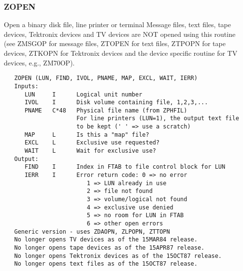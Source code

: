 \subsubsection{ZOPEN}
Open a binary disk file, line printer or terminal  Message files, text
files, tape devices, Tektronix devices and TV devices are NOT opened
using this routine (see ZMSGOP for message files, ZTOPEN for text
files, ZTPOPN for tape devices, ZTKOPN for Tektronix devices and the
device specific routine for TV devices, e.g., ZM70OP).
\begin{verbatim}
   ZOPEN (LUN, FIND, IVOL, PNAME, MAP, EXCL, WAIT, IERR)
   Inputs:
      LUN     I      Logical unit number
      IVOL    I      Disk volume containing file, 1,2,3,...
      PNAME   C*48   Physical file name (from ZPHFIL)
                     For line printers (LUN=1), the output text file
                     to be kept (' ' => use a scratch)
      MAP     L      Is this a "map" file?
      EXCL    L      Exclusive use requested?
      WAIT    L      Wait for exclusive use?
   Output:
      FIND    I      Index in FTAB to file control block for LUN
      IERR    I      Error return code: 0 => no error
                        1 => LUN already in use
                        2 => file not found
                        3 => volume/logical not found
                        4 => exclusive use denied
                        5 => no room for LUN in FTAB
                        6 => other open errors
   Generic version - uses ZDAOPN, ZLPOPN, ZTTOPN
   No longer opens TV devices as of the 15MAR84 release.
   No longer opens tape devices as of the 15APR87 release.
   No longer opens Tektronix devices as of the 15OCT87 release.
   No longer opens text files as of the 15OCT87 release.
\end{verbatim}

